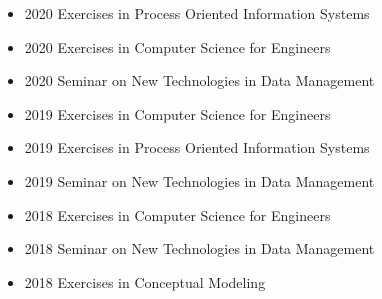 \documentclass[a4paper, 11pt]{article}
\begin{document}
\begin{itemize}[noitemsep, leftmargin=*]
\begin{itemize}
				\item 2020 Exercises in Process Oriented Information Systems

				\item 2020 Exercises in Computer Science for Engineers

				\item 2020 Seminar on New Technologies in Data Management

				\item 2019 Exercises in Computer Science for Engineers

				\item 2019 Exercises in Process Oriented Information Systems

				\item 2019 Seminar on New Technologies in Data Management

				\item 2018 Exercises in Computer Science for Engineers

				\item 2018 Seminar on New Technologies in Data Management

				\item 2018 Exercises in Conceptual Modeling
			\end{itemize}
	\end{itemize}
	\vspace{10pt}
\end{document}
